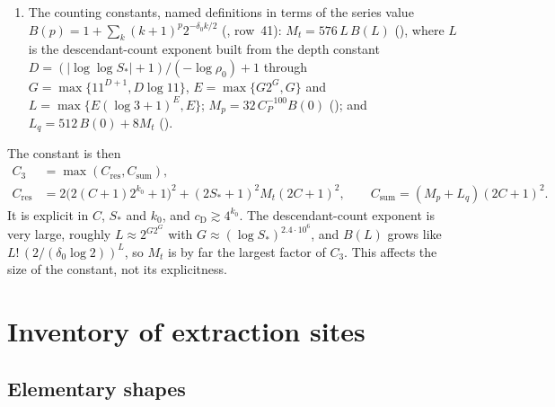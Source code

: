\documentclass[11pt]{article}
\newcommand{\cD}{c_{\mathrm D}}
\newcommand{\Cres}{C_{\mathrm{res}}}
\newcommand{\Csum}{C_{\mathrm{sum}}}
\begin{document}
\begin{enumerate}
          against $R/2$. Each is logarithmic in its data.
    \item The counting constants, named definitions in terms of the series
          value $B(p)=1+\sum_k(k+1)^p2^{-\delta_0k/2}$
          (,
          row~41): $M_t=576\,L\,B(L)$
          (),
          where $L$ is the descendant-count exponent built from the depth
          constant $D=(|\log\log S_*|+1)/(-\log\rho_0)+1$ through
          $G=\max\{11^{D+1},D\log11\}$, $E=\max\{G2^G,G\}$ and
          $L=\max\{E(\log3+1)^E,E\}$; $M_p=32\,C_P^{-100}B(0)$
          (); and
          $L_q=512\,B(0)+8M_t$
          ().
\end{enumerate}
The constant is then
\begin{align*}
    C_3    & =\max(\Cres,\Csum),                                                    \\
    \Cres & =2\bigl(2(C+1)2^{k_0}+1\bigr)^2+(2S_*+1)^2M_t(2C+1)^2,\qquad
    \Csum=(M_p+L_q)(2C+1)^2.
\end{align*}
It is explicit in $C$, $S_*$ and $k_0$, and $\cD\gtrsim4^{k_0}$. The
descendant-count exponent is very large, roughly $L\approx2^{G2^G}$ with
$G\approx(\log S_*)^{2.4\cdot10^6}$, and $B(L)$ grows like
$L!\,(2/(\delta_0\log2))^{L}$, so $M_t$ is by far the largest factor of
$C_3$. This affects the size of the constant, not its explicitness.

\section{Inventory of extraction sites}
\label{sec:inventory}

\subsection{Elementary shapes}
\end{document}

